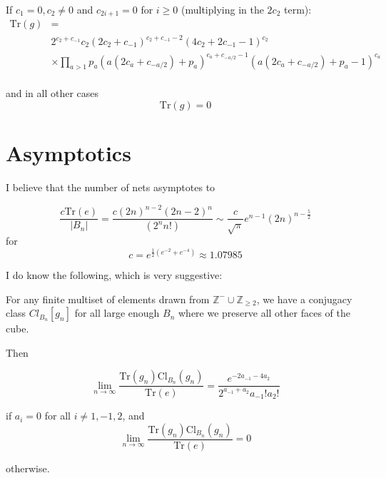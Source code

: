 \documentclass[10pt]{article}
\newcommand{\Tr}{\text{Tr}}
\newcommand{\Cl}{\text{Cl}}
\newcommand{\half}{\frac{1}{2}}
\begin{document}
If $c_1=0, c_2 \ne 0$ and $c_{2i+1}=0$ for $i\ge 0$ (multiplying in the $2c_2$ term):
\begin{align*}
  \Tr(g)&=\\
  &2^{c_2+c_{-1}}c_2(2c_2+c_{-1})^{c_2+c_{-1}-2}(4c_2+2c_{-1}-1)^{c_2}\\
  &\times\prod_{a >1}p_a(a(2c_a+c_{-a/2})+p_a)^{c_a+c_{-a/2}-1}(a(2c_a+c_{-a/2})+p_a-1)^{c_a}\\
\end{align*}


and in all other cases
\[\Tr(g)=0\]

\section{Asymptotics}

I believe that the number of nets asymptotes to

\[\frac{c\Tr(e)}{|B_n|} = \frac{c(2n)^{n-2}(2n-2)^{n}}{(2^nn!)}\sim\frac{c}{\sqrt{\pi}}e^{n-1}(2n)^{n-\frac{5}{2}}\]
for
\[c= e^{\half(e^{-2}+e^{-4})}\approx 1.07985 \]

I do know the following, which is very suggestive:

For any finite multiset of elements drawn from $\mathbb{Z}^- \cup \mathbb{Z}_{\ge2}$, we have a conjugacy class $Cl_{B_n}[g_n]$ for all large enough $B_n$ where we preserve all other faces of the cube.

Then

\[\lim_{n \to \infty}\frac{\Tr(g_n)\Cl_{B_n}(g_n)}{\Tr(e)} = \frac{e^{-2a_{-1}-4a_2}}{2^{a_{-1}+a_2}a_{-1}!a_{2}!}\]

if $a_i =0$ for all $i \ne 1,-1,2$, and 
\[\lim_{n \to \infty}\frac{\Tr(g_n)\Cl_{B_n}(g_n)}{\Tr(e)} =  0\]

otherwise. 
\iffalse

  $2n \ge a(2c_a+c_{-a/2})+p_{a},p_a \le 2n-a(2c_a+c_{-a/2}) \le 2n*(\frac{(2n-2)}{2n})^{2c_a+c{-a/2}}$. So the total from the product coming from everything of size $a$ is bounded above by $(2n-2)^{\# \text{cycles }}$


  For the no-1-cycle case, we can get a bound of $n(2n)^{\#\text{cycles}-2} \le (2n-2)^{\#\text{cycles}}-1$ also.


  $\Tr(e)/\Tr(g)=(2n-2)^{\#\text{of fewer cycles in } g}*(2n/2n-2)^{n-1-c_1}/(2c_1-2)^{c_1}(2c_1)^{c_1-2}$

\fi
  
\end{document}
